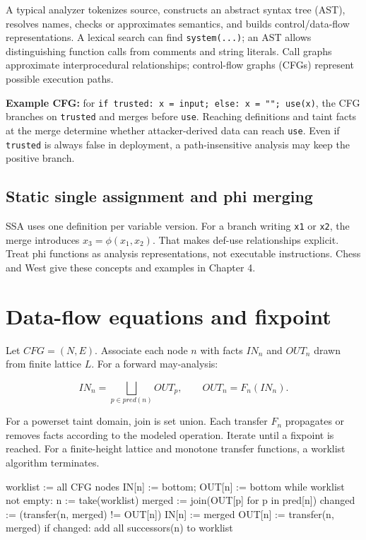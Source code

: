 \documentclass[
  letterpaper,
]{article}
\newenvironment{Shaded}{}{}
\newcommand{\NormalTok}[1]{#1}
\begin{document}
A typical analyzer tokenizes source, constructs an abstract syntax tree
(AST), resolves names, checks or approximates semantics, and builds
control/data-flow representations. A lexical search can find
\texttt{system(...)}; an AST allows distinguishing function calls from
comments and string literals. Call graphs approximate interprocedural
relationships; control-flow graphs (CFGs) represent possible execution
paths.

\textbf{Example CFG:} for
\texttt{if\ trusted:\ x\ =\ input;\ else:\ x\ =\ "";\ use(x)}, the CFG
branches on \texttt{trusted} and merges before \texttt{use}. Reaching
definitions and taint facts at the merge determine whether
attacker-derived data can reach \texttt{use}. Even if \texttt{trusted}
is always false in deployment, a path-insensitive analysis may keep the
positive branch.

\subsection{Static single assignment and phi
merging}\label{static-single-assignment-and-phi-merging}

SSA uses one definition per variable version. For a branch writing
\texttt{x1} or \texttt{x2}, the merge introduces \(x_3=\phi(x_1,x_2)\).
That makes def-use relationships explicit. Treat phi functions as
analysis representations, not executable instructions. Chess and West
give these concepts and examples in Chapter 4.

\section{Data-flow equations and
fixpoint}\label{data-flow-equations-and-fixpoint}

Let \(CFG=(N,E)\). Associate each node \(n\) with facts \(IN_n\) and
\(OUT_n\) drawn from finite lattice \(L\). For a forward may-analysis:

\[IN_n=\bigsqcup_{p\in pred(n)} OUT_p,\qquad OUT_n=F_n(IN_n).\]

For a powerset taint domain, join is set union. Each transfer \(F_n\)
propagates or removes facts according to the modeled operation. Iterate
until a fixpoint is reached. For a finite-height lattice and monotone
transfer functions, a worklist algorithm terminates.

\begin{Shaded}
\begin{Highlighting}[]
\NormalTok{worklist := all CFG nodes}
\NormalTok{IN[n] := bottom; OUT[n] := bottom}
\NormalTok{while worklist not empty:}
\NormalTok{    n := take(worklist)}
\NormalTok{    merged := join(OUT[p] for p in pred[n])}
\NormalTok{    changed := (transfer(n, merged) != OUT[n])}
\NormalTok{    IN[n] := merged}
\NormalTok{    OUT[n] := transfer(n, merged)}
\NormalTok{    if changed: add all successors(n) to worklist}
\end{Highlighting}
\end{Shaded}
\end{document}
